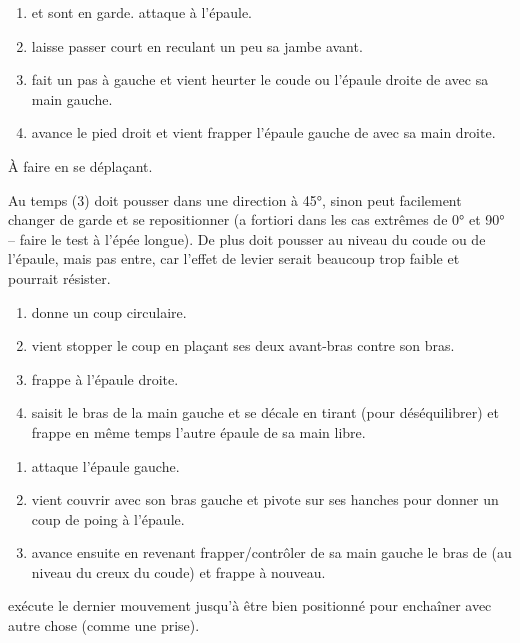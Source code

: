 \begin{exercice}

\begin{enumerate}
	\item \A et \D sont en garde.
	\A attaque \D à l'épaule.
	
	\item \D laisse passer court en reculant un peu sa jambe avant.
	
	\item \D fait un pas à gauche et vient heurter le coude ou l'épaule droite de \A avec sa main gauche.
	
	\item \D avance le pied droit et vient frapper l'épaule gauche de \A avec sa main droite.
\end{enumerate}

À faire en se déplaçant.

Au temps (3) \D doit pousser dans une direction à 45°, sinon \A peut facilement changer de garde et se repositionner (a fortiori dans les cas extrêmes de \ang{0} et \ang{90} -- faire le test à l'épée longue).
De plus \D doit pousser au niveau du coude ou de l'épaule, mais pas entre, car l'effet de levier serait beaucoup trop faible et \A pourrait résister.

\end{exercice}


\begin{exercice}

\begin{enumerate}
	\item \A donne un coup circulaire.
	
	\item \D vient stopper le coup en plaçant ses deux avant-bras contre son bras.
	
	\item \D frappe à l'épaule droite.
	
	\item \D saisit le bras de la main gauche et se décale en tirant (pour déséquilibrer) et frappe en même temps l'autre épaule de sa main libre.
\end{enumerate}
\end{exercice}


\begin{technique}
\begin{enumerate}
	\item \A attaque l'épaule gauche.
	
	\item \D vient couvrir avec son bras gauche et pivote sur ses hanches pour donner un coup de poing à l'épaule.
	
	\item \D avance ensuite en revenant frapper/contrôler de sa main gauche le bras de \A (au niveau du creux du coude) et frappe à nouveau.
\end{enumerate}

\D exécute le dernier mouvement jusqu'à être bien positionné pour enchaîner avec autre chose (comme une prise).
\end{technique}



